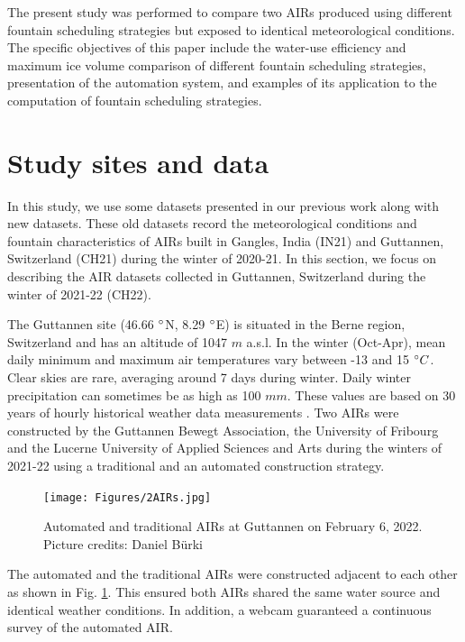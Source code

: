 \documentclass[tc, manuscript]{copernicus}
\begin{document}
The present study was performed to compare two AIRs produced using different fountain scheduling strategies but
exposed to identical meteorological conditions. The specific objectives of this paper include the water-use
efficiency and maximum ice volume comparison of different fountain scheduling strategies, presentation of the
automation system, and examples of its application to the computation of fountain scheduling strategies.

\section{Study sites and data}

In this study, we use some datasets presented in our previous work
\citep{balasubramanianInfluenceMeteorologicalConditions2022} along with new datasets. These old datasets record
the meteorological conditions and fountain characteristics of AIRs built in Gangles, India (IN21) and Guttannen,
Switzerland (CH21) during the winter of 2020-21. In this section, we focus on describing the AIR datasets
collected in Guttannen, Switzerland during the winter of 2021-22 (CH22).

The Guttannen site (46.66 $^{\circ}$N, 8.29 $^{\circ}$E) is situated in the Berne region, Switzerland and has an
altitude of 1047 $m$ a.s.l. In the winter (Oct-Apr), mean daily minimum and maximum air temperatures vary
between -13 and 15 $^{\circ} C$. Clear skies are rare, averaging around 7 days during winter. Daily winter
precipitation can sometimes be as high as 100 $mm$. These values are based on 30 years of hourly historical
weather data measurements \citep{meteoblueClimateGuttannen2021}. Two AIRs were constructed by the Guttannen
Bewegt Association, the University of Fribourg and the Lucerne University of Applied Sciences and Arts during
the winters of 2021-22 using a traditional and an automated construction strategy.

\begin{figure}[t]
\texttt{[image: Figures/2AIRs.jpg]}
\caption{Automated and traditional AIRs at Guttannen on February 6, 2022. Picture credits: Daniel Bürki}
\label{fig:2AIR}
\end{figure}

The automated and the traditional AIRs were constructed adjacent to each other as shown in Fig. \ref{fig:2AIR}.
This ensured both AIRs shared the same water source and identical weather conditions. In addition, a webcam
guaranteed a continuous survey of the automated AIR.   
\end{document}
